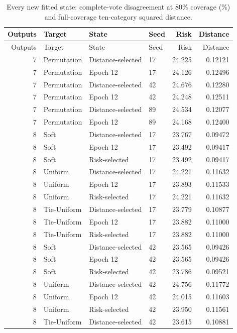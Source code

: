 \begingroup\small\setlength{\tabcolsep}{4pt}\setlength{\LTcapwidth}{\linewidth}
\begin{longtable}{rlllrr}
\caption{Every new fitted state: complete-vote disagreement at 80\% coverage (\%) and full-coverage ten-category squared distance.}\label{tab:new-all-states}\\
\toprule Outputs & Target & State & Seed & Risk & Distance\\\midrule\endfirsthead
\toprule Outputs & Target & State & Seed & Risk & Distance\\\midrule\endhead
7 & Permutation & Distance-selected & 17 & 24.225 & 0.12121\\
7 & Permutation & Epoch 12 & 17 & 24.126 & 0.12496\\
7 & Permutation & Distance-selected & 42 & 24.676 & 0.12280\\
7 & Permutation & Epoch 12 & 42 & 24.248 & 0.12511\\
7 & Permutation & Distance-selected & 89 & 24.534 & 0.12077\\
7 & Permutation & Epoch 12 & 89 & 24.168 & 0.12400\\
8 & Soft & Distance-selected & 17 & 23.767 & 0.09472\\
8 & Soft & Epoch 12 & 17 & 23.492 & 0.09417\\
8 & Soft & Risk-selected & 17 & 23.492 & 0.09417\\
8 & Uniform & Distance-selected & 17 & 24.221 & 0.11632\\
8 & Uniform & Epoch 12 & 17 & 23.893 & 0.11533\\
8 & Uniform & Risk-selected & 17 & 24.221 & 0.11632\\
8 & Tie-Uniform & Distance-selected & 17 & 23.779 & 0.10877\\
8 & Tie-Uniform & Epoch 12 & 17 & 23.882 & 0.11000\\
8 & Tie-Uniform & Risk-selected & 17 & 23.882 & 0.11000\\
8 & Soft & Distance-selected & 42 & 23.565 & 0.09426\\
8 & Soft & Epoch 12 & 42 & 23.565 & 0.09426\\
8 & Soft & Risk-selected & 42 & 23.786 & 0.09521\\
8 & Uniform & Distance-selected & 42 & 24.756 & 0.11772\\
8 & Uniform & Epoch 12 & 42 & 24.015 & 0.11603\\
8 & Uniform & Risk-selected & 42 & 23.950 & 0.11561\\
8 & Tie-Uniform & Distance-selected & 42 & 23.615 & 0.10881\\

\end{longtable}
